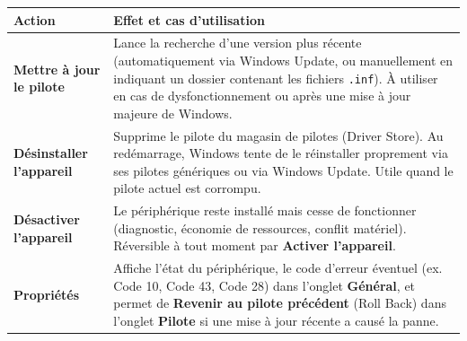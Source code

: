 \documentclass[11pt]{article}
\begin{document}
\begin{center}
\begin{tabularx}{\linewidth}{|l|X|}
\hline
\rowcolor{popblueL} \textbf{Action} & \textbf{Effet et cas d'utilisation} \\
\hline
\textbf{Mettre à jour le pilote} & Lance la recherche d'une version plus récente (automatiquement via Windows Update, ou manuellement en indiquant un dossier contenant les fichiers \texttt{.inf}). À utiliser en cas de dysfonctionnement ou après une mise à jour majeure de Windows. \\
\hline
\textbf{Désinstaller l'appareil} & Supprime le pilote du magasin de pilotes (Driver Store). Au redémarrage, Windows tente de le réinstaller proprement via ses pilotes génériques ou via Windows Update. Utile quand le pilote actuel est corrompu. \\
\hline
\textbf{Désactiver l'appareil} & Le périphérique reste installé mais cesse de fonctionner (diagnostic, économie de ressources, conflit matériel). Réversible à tout moment par \textbf{Activer l'appareil}. \\
\hline
\textbf{Propriétés} & Affiche l'état du périphérique, le code d'erreur éventuel (ex. Code 10, Code 43, Code 28) dans l'onglet \textbf{Général}, et permet de \textbf{Revenir au pilote précédent} (Roll Back) dans l'onglet \textbf{Pilote} si une mise à jour récente a causé la panne. \\
\hline
\end{tabularx}
\end{center}
\end{document}
